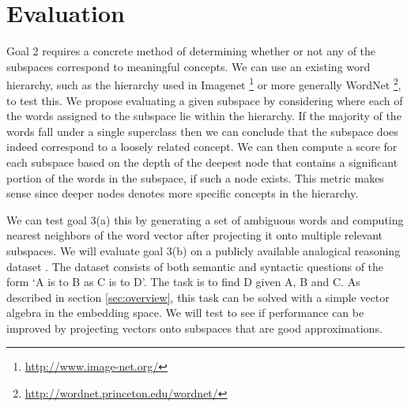 \section{Evaluation}\label{sec:evaluation}

Goal 2 requires a concrete method of determining whether or not any of the subspaces correspond to meaningful concepts. 
We can use an existing word hierarchy, such as the hierarchy used in Imagenet \footnote{\url{http://www.image-net.org/}} or more generally  WordNet \footnote{\url{http://wordnet.princeton.edu/wordnet/}}, to test this. 
We propose evaluating a given subspace by considering where each of the words assigned to the subspace lie within the hierarchy.
If the majority of the words fall under a single superclass then we can conclude that the subspace does indeed correspond to a loosely related concept. 
We can then compute a score for each subspace based on the depth of the deepest node that contains a significant portion of the words in the subspace, if such a node exists. 
This metric makes sense since deeper nodes denotes more specific concepts in the hierarchy. 

We can test goal 3(a) this by generating a set of ambiguous words and computing nearest neighbors of the word vector after projecting it onto multiple relevant subspaces. 
We will evaluate goal 3(b) on a publicly available analogical reasoning dataset \cite{mikolov3}. 
The dataset consists of both semantic and syntactic questions of the form `A is to B as C is to D'.
The task is to find D given A, B and C. 
As described in section \ref{sec:overview}, this task can be solved with a simple vector algebra in the embedding space.
We will test to see if performance can be improved by projecting vectors onto subspaces that are good approximations. 
